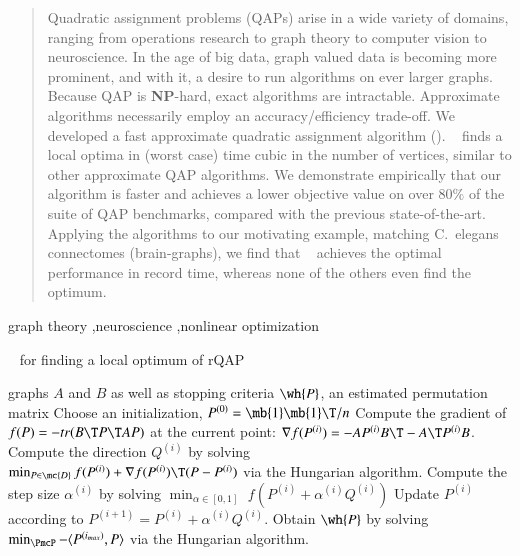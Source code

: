 \documentclass[preprint,11pt]{elsarticle}
\begin{document}
\begin{frontmatter}
\begin{abstract}
Quadratic assignment problems (QAPs) arise in a wide variety of domains, ranging from operations research to graph theory to computer vision to neuroscience.  In the age of big data, graph valued data is becoming more prominent, and with it, a desire to run algorithms on ever larger graphs.  Because QAP is \textbf{NP}-hard, exact algorithms are intractable.  Approximate algorithms necessarily employ an accuracy/efficiency trade-off. We developed a fast approximate quadratic assignment algorithm (\FAQ). \FAQ~ finds a local optima in (worst case) time cubic in the number of vertices, similar to other approximate QAP algorithms.  We demonstrate empirically that our algorithm is faster and achieves a lower objective value on over $80\%$ of the suite of QAP benchmarks, compared with the previous state-of-the-art.  Applying the algorithms to our motivating example, matching C.~elegans connectomes (brain-graphs), we find that \FAQ~ achieves the optimal performance in record time, whereas none of the others even find the optimum.
\end{abstract}

\begin{keyword}

graph theory \sep neuroscience \sep nonlinear optimization


\end{keyword}


\end{frontmatter}




\begin{algorithm}
	\caption{\FAQ~ for finding a local optimum of rQAP} \label{alg:1}
\begin{algorithmic}[1]
	\REQUIRE graphs $A$ and $B$ as well as stopping criteria
	\ENSURE $\wh{P}$, an estimated permutation matrix
	\STATE Choose an initialization, $P^{(0)}=\mb{1}\mb{1}\T/n$ \label{step:init} %
	\STATE Compute the gradient of $f(P)=-tr(B\T P\T AP)$ at the current point:
		$\nabla f (P^{(i)}) =  - A P^{(i)} B\T - A\T P^{(i)} B$.
	\STATE Compute the direction $Q^{(i)}$ by solving \\  $\min_{P \in \mc{D}} f(P^{(i)}) + \nabla f(P^{(i)})\T(P - P^{(i)})$ via the Hungarian algorithm.
		\STATE Compute the step size $\alpha^{(i)}$ by solving 
					$\min_{\alpha \in [0,1]}$    $f(P^{(i)} + \alpha^{(i)} Q^{(i)})$ 
			\STATE Update $P^{(i)}$ according to 
				$P^{(i+1)} = P^{(i)} + \alpha^{(i)} Q^{(i)}$.
	\ENDWHILE
	\STATE Obtain $\wh{P}$ by solving 
	$\min_{\PmcP}    -\langle P^{(i_{max})}, P \rangle$ 	via the Hungarian algorithm.
\end{algorithmic}
\end{algorithm}
\end{document}
